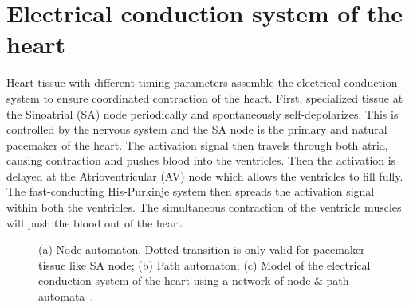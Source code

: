 \documentclass[openany]{now} %
\begin{document}
\section{Electrical conduction system of the heart}
Heart tissue with different timing parameters assemble the electrical conduction system to ensure coordinated contraction of the heart. First, specialized tissue at the Sinoatrial (SA) node periodically and spontaneously self-depolarizes. This is controlled by the nervous system and the SA node is the primary and natural pacemaker of the heart. The activation signal then travels through both atria, causing contraction and pushes blood into the ventricles. Then the activation is delayed at the Atrioventricular (AV) node which allows the ventricles to fill fully. The fast-conducting His-Purkinje system then spreads the activation signal within both the ventricles. The simultaneous contraction of the ventricle muscles will push the blood out of the heart.
\begin{figure}[!t]
\centering
		
\caption{\small (a) Node automaton. Dotted transition is only valid for pacemaker tissue like SA node; (b) Path automaton; (c) Model of the electrical conduction system of the heart using a network of node \& path automata~\cite{vhm_ecrts10}.}
\end{figure} 
\end{document}

